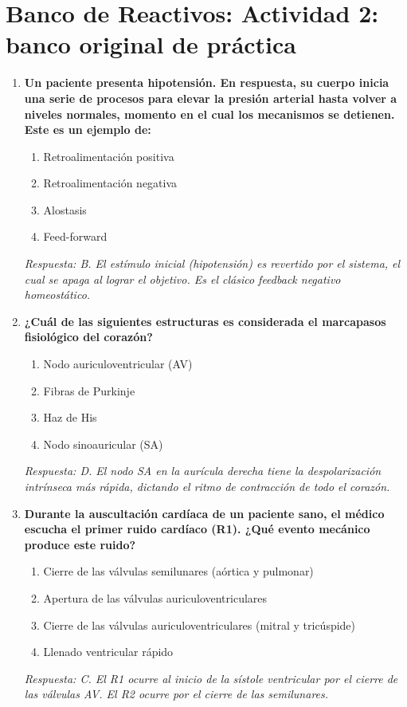 \section{Banco de Reactivos: Actividad 2: banco original de práctica}
\begin{enumerate}[label=\textbf{\arabic*.}]
    \item \textbf{Un paciente presenta hipotensión. En respuesta, su cuerpo inicia una serie de procesos para elevar la presión arterial hasta volver a niveles normales, momento en el cual los mecanismos se detienen. Este es un ejemplo de:}
    \begin{enumerate}
        \item[A)] Retroalimentación positiva
        \item[B)] Retroalimentación negativa
        \item[C)] Alostasis
        \item[D)] Feed-forward
    \end{enumerate}
    \textit{Respuesta: B. El estímulo inicial (hipotensión) es revertido por el sistema, el cual se apaga al lograr el objetivo. Es el clásico feedback negativo homeostático.}

    \item \textbf{¿Cuál de las siguientes estructuras es considerada el marcapasos fisiológico del corazón?}
    \begin{enumerate}
        \item[A)] Nodo auriculoventricular (AV)
        \item[B)] Fibras de Purkinje
        \item[C)] Haz de His
        \item[D)] Nodo sinoauricular (SA)
    \end{enumerate}
    \textit{Respuesta: D. El nodo SA en la aurícula derecha tiene la despolarización intrínseca más rápida, dictando el ritmo de contracción de todo el corazón.}

    \item \textbf{Durante la auscultación cardíaca de un paciente sano, el médico escucha el primer ruido cardíaco (R1). ¿Qué evento mecánico produce este ruido?}
    \begin{enumerate}
        \item[A)] Cierre de las válvulas semilunares (aórtica y pulmonar)
        \item[B)] Apertura de las válvulas auriculoventriculares
        \item[C)] Cierre de las válvulas auriculoventriculares (mitral y tricúspide)
        \item[D)] Llenado ventricular rápido
    \end{enumerate}
    \textit{Respuesta: C. El R1 ocurre al inicio de la sístole ventricular por el cierre de las válvulas AV. El R2 ocurre por el cierre de las semilunares.}


\end{enumerate}
